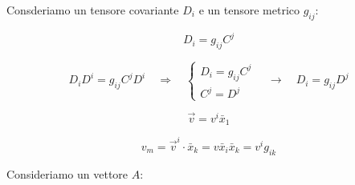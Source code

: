 \newpage

Consderiamo un tensore covariante $D_i$ e un tensore metrico $g_{ij}$:

$$
D_i = g_{ij} C^j
$$


$$
D_i D^i = g_{ij} C^j D^i \quad \Rightarrow \quad 
\begin{cases}
    D_i = g_{ij} C^j\\
    C^j = D^j
\end{cases}
\quad \rightarrow \quad 
D_i = g_{ij} D^j
$$

\vspace{5em}

$$
\vec v = v^i \bar x_1
$$

$$
v_m = \vec v^i \cdot \bar x_k = v \bar x_i \bar x_k = v^i g_{ik}
$$

Consideriamo un vettore $A$:

